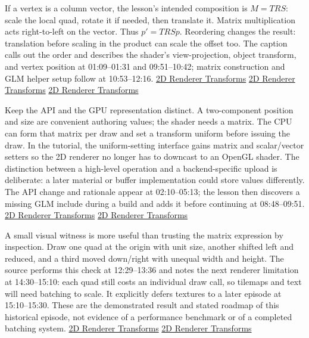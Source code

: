 If a vertex is a column vector, the lesson's intended composition is \(M=TRS\): scale the local quad, rotate it if needed, then translate it. Matrix multiplication acts right-to-left on the vector. Thus \(p'=TRSp\). Reordering changes the result: translation before scaling in the product can scale the offset too. The caption calls out the order and describes the shader's view-projection, object transform, and vertex position at 01:09--01:31 and 09:51--10:42; matrix construction and GLM helper setup follow at 10:53--12:16. \href{https://www.youtube.com/watch?v=-Qt12lcAF0Y&t=69s}{2D Renderer Transforms} \href{https://www.youtube.com/watch?v=-Qt12lcAF0Y&t=591s}{2D Renderer Transforms} \href{https://www.youtube.com/watch?v=-Qt12lcAF0Y&t=653s}{2D Renderer Transforms}

Keep the API and the GPU representation distinct. A two-component position and size are convenient authoring values; the shader needs a matrix. The CPU can form that matrix per draw and set a transform uniform before issuing the draw. In the tutorial, the uniform-setting interface gains matrix and scalar/vector setters so the 2D renderer no longer has to downcast to an OpenGL shader. The distinction between a high-level  operation and a backend-specific upload is deliberate: a later material or buffer implementation could store values differently. The API change and rationale appear at 02:10--05:13; the lesson then discovers a missing GLM include during a build and adds it before continuing at 08:48--09:51. \href{https://www.youtube.com/watch?v=-Qt12lcAF0Y&t=130s}{2D Renderer Transforms} \href{https://www.youtube.com/watch?v=-Qt12lcAF0Y&t=528s}{2D Renderer Transforms}

A small visual witness is more useful than trusting the matrix expression by inspection. Draw one quad at the origin with unit size, another shifted left and reduced, and a third moved down/right with unequal width and height. The source performs this check at 12:29--13:36 and notes the next renderer limitation at 14:30--15:10: each quad still costs an individual draw call, so tilemaps and text will need batching to scale. It explicitly defers textures to a later episode at 15:10--15:30. These are the demonstrated result and stated roadmap of this historical episode, not evidence of a performance benchmark or of a completed batching system. \href{https://www.youtube.com/watch?v=-Qt12lcAF0Y&t=749s}{2D Renderer Transforms} \href{https://www.youtube.com/watch?v=-Qt12lcAF0Y&t=870s}{2D Renderer Transforms}

